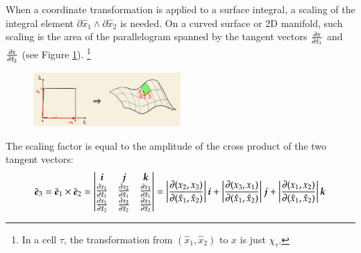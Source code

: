 \documentclass[11pt, a4paper]{book}
\begin{document}
When a coordinate transformation is applied to a surface integral, a scaling of the
integral element $\partial \hat{x}_1 \wedge \partial \hat{x}_2$ is needed. On a curved
surface or 2D manifold, such scaling is the area of the parallelogram spanned by the
tangent vectors $\frac{\partial x}{\partial \hat{x}_1}$ and
$\frac{\partial x}{\partial \hat{x}_2}$ (see Figure \ref{fig:surface-element-scaling}).
\footnote{In a cell $\tau$, the transformation from $(\hat{x}_1, \hat{x}_2)$ to $x$ is
  just $\chi_{\tau}$.}
\begin{figure}[htbp]
  \centering
  \includegraphics[width=0.5\textwidth, height=\textheight, keepaspectratio]{figures/surface-element-scaling-draft}
  \caption{}
  \label{fig:surface-element-scaling}
\end{figure}
The scaling factor is equal to the amplitude of the cross product of the two tangent
vectors:
\begin{equation}
  \tilde{\boldsymbol{e}}_3=\tilde{\boldsymbol{e}}_1\times\tilde{\boldsymbol{e}}_2=\left\vert\begin{matrix}
      \boldsymbol{i} & \boldsymbol{j} & \boldsymbol{k} \\
      \frac{\partial x_{1}}{\partial \hat{x}_{1}} & \frac{\partial x_{2}}{\partial \hat{x}_{1}} & \frac{\partial
        x_{3}}{\partial \hat{x}_{1}} \\
      \frac{\partial x_{1}}{\partial \hat{x}_{2}} & \frac{\partial x_{2}}{\partial \hat{x}_{2}} & \frac{\partial
        x_{3}}{\partial \hat{x}_{2}}
    \end{matrix}\right\vert=
  \left\vert\frac{\partial (x_{2},x_{3})}{\partial (\hat{x}_1,\hat{x}_2)}\right\vert \boldsymbol{i} +
  \left\vert\frac{\partial (x_{3},x_{1})}{\partial (\hat{x}_1,\hat{x}_2)}\right\vert \boldsymbol{j} +
  \left\vert\frac{\partial (x_{1},x_{2})}{\partial (\hat{x}_1,\hat{x}_2)}\right\vert \boldsymbol{k}
\end{equation}
\end{document}

